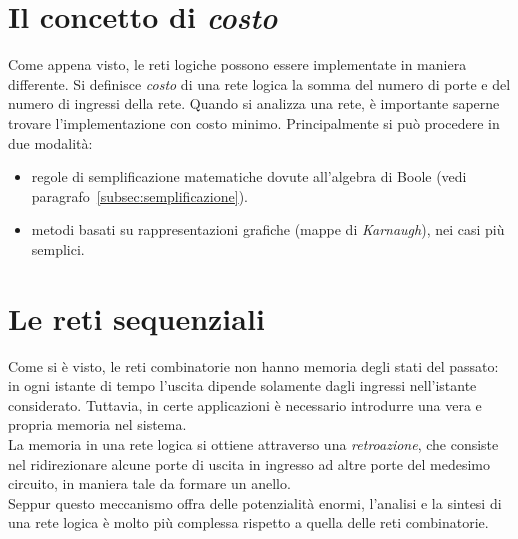 \documentclass[class=book, crop=false]{standalone}
\begin{document}
\section{Il concetto di \emph{costo}}
Come appena visto, le reti logiche possono essere implementate in maniera differente. Si definisce \emph{costo} di una rete logica la somma del numero di porte e del numero di ingressi della rete. Quando si analizza una rete, è importante saperne trovare l'implementazione con costo minimo. Principalmente si può procedere in due modalità:
\begin{itemize}[noitemsep]
	\item regole di semplificazione matematiche dovute all'algebra di Boole (vedi paragrafo~\ref{subsec:semplificazione}).
	\item metodi basati su rappresentazioni grafiche (mappe di \emph{Karnaugh}), nei casi più semplici.
\end{itemize}

\section{Le reti sequenziali}
Come si è visto, le reti combinatorie non hanno memoria degli stati del passato: in ogni istante di tempo l’uscita dipende solamente dagli ingressi nell’istante considerato. Tuttavia, in certe applicazioni è necessario introdurre una vera e propria memoria nel sistema.\\
La memoria in una rete logica si ottiene attraverso una \emph{retroazione}, che consiste nel ridirezionare alcune porte di uscita in ingresso ad altre porte del medesimo circuito, in maniera tale da formare un anello.\\
Seppur questo meccanismo offra delle potenzialità enormi, l'analisi e la sintesi di una rete logica è molto più complessa rispetto a quella delle reti combinatorie.
\end{document}
